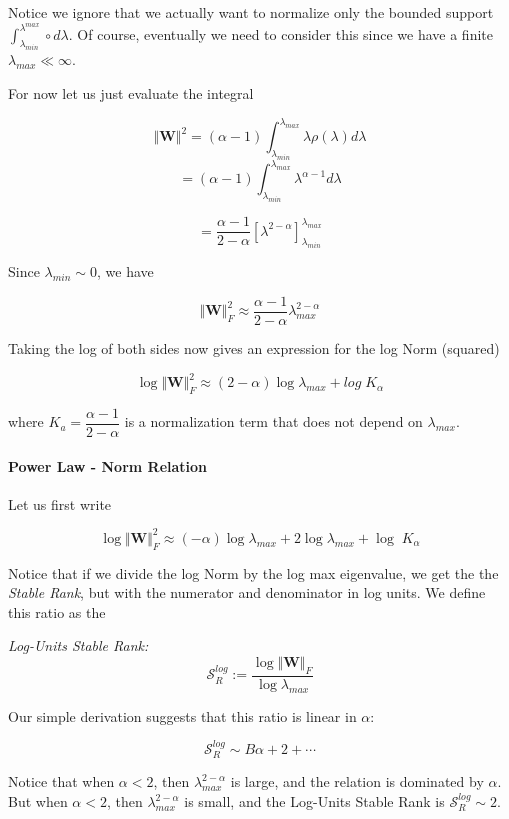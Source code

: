 Notice we ignore that we actually want to normalize only the bounded support  $\int_{\lambda_{min}}^{\lambda^{max}}\circ d\lambda$.
Of course, eventually we need to consider this since we have a finite $\lambda_{max}\ll\infty$.  

For now let us just evaluate the integral

$$\Vert\mathbf{W}\Vert^{2}=(\alpha-1)\int_{\lambda_{min}}^{\lambda_{max}}\lambda\rho(\lambda)d\lambda$$
$$=(\alpha-1)\int_{\lambda_{min}}^{\lambda_{max}}\lambda^{\alpha-1}d\lambda$$

$$=\dfrac{\alpha-1}{2-\alpha}\left[\lambda^{2-\alpha}\right]^{\lambda_{max}}_{\lambda_{min}}$$

Since $\lambda_{min}\sim 0$, we have 

$$\Vert\mathbf{W}\Vert_{F}^{2}\approx\dfrac{\alpha-1}{2-\alpha}\lambda^{2-\alpha}_{max}$$

Taking the log of both sides now gives an expression for the log Norm (squared) 

$$\log\Vert\mathbf{W}\Vert^{2}_{F}\approx(2-\alpha)\log\lambda_{max}+log\;K_{\alpha}$$

where $K_{a}={\dfrac{\alpha-1}{2-\alpha}}$ is a normalization term that does not  depend on $\lambda_{max}$.

\paragraph{Power Law - Norm Relation}


Let us first write

$$\log\Vert\mathbf{W}\Vert^{2}_{F}\approx(-\alpha)\log\lambda_{max}+2\log\lambda_{max}+\log\;K_{\alpha}$$

Notice that if we divide the log Norm by the log max eigenvalue, we get the the \emph{Stable Rank}, but with
the numerator and denominator in log units.  We define this ratio as the

\emph{Log-Units Stable Rank:  } 
$$\mathcal{S}^{log}_{R}:=\dfrac{\log\Vert\mathbf{W}\Vert_{F}}{\log\lambda_{max}}$$

Our simple derivation suggests that this ratio is linear in $\alpha$:

$$\mathcal{S}^{log}_{R}\sim B\alpha+2+\cdots$$


Notice that when $\alpha<2$, then $\lambda_{max}^{2-\alpha}$ is large, and the relation is dominated by $\alpha$.
But when $\alpha<2$, then $\lambda_{max}^{2-\alpha}$ is small, and the Log-Units Stable Rank is $\mathcal{S}^{log}_{R}\sim 2$.

